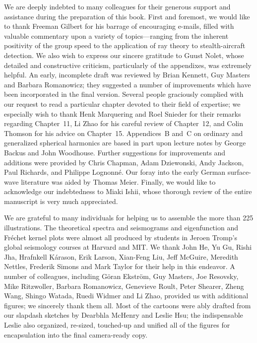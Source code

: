 \thispagestyle{myheadings} 
We are deeply indebted to many colleagues for their generous
support and assistance during the preparation of this book.
First and foremost, we would like to thank Freeman Gilbert
for his barrage of encouraging e-mails, filled with valuable
commentary upon a variety of topics---ranging from the inherent
positivity of the group speed to the application of ray theory
to stealth-aircraft detection.  We also wish to express our
sincere gratitude to Guust Nolet, whose detailed and constructive
criticism, particularly of the appendixes, was extremely helpful.
An early, incomplete draft was reviewed by Brian Kennett,
Guy Masters and Barbara Romanowicz; they suggested
a number of improvements which have been incorporated in the
final version.  Several people graciously complied with our
request to read a particular chapter
devoted to their field of expertise; we especially wish
to thank Henk Marquering and Roel Snieder for their
remarks regarding Chapter~11, Li Zhao for his careful
review of Chapter~12, and Colin Thomson
for his advice on Chapter~15.  Appendices~B and~C on ordinary
and generalized spherical harmonics are based in part upon lecture
notes by George Backus and John Woodhouse.  Further suggestions
for improvements and additions were provided by Chris Chapman, Adam Dziewonski,
Andy Jackson, Paul Richards, and Philippe Lognonn\'{e}.  Our
foray into the early German surface-wave literature was aided
by Thomas Meier.  Finally, we would like to acknowledge our
indebtedness to Miaki Ishii, whose thorough review of the entire
manuscript is very much appreciated.

We are grateful to many individuals for helping us
to assemble the more than 225 illustrations.  The theoretical
spectra and seismograms and eigenfunction and Fr\'{e}chet kernel plots
were almost all produced by students in Jeroen Tromp's global seismology
courses at Harvard and MIT.  We thank John He, Yu Gu, Rishi Jha,
Hrafnkell K\'{a}rason, Erik Larson, Xian-Feng Liu, Jeff McGuire, Meredith Nettles,
Frederik Simons and Mark Taylor for their help in this endeavor.
A number of colleagues, including G\"{o}ran Ekstr\"{o}m, Guy Masters,
Joe Resovsky, Mike Ritzwoller, Barbara Romanowicz, Genevieve Roult,
Peter Shearer, Zheng Wang, Shingo Watada, Ruedi Widmer and Li Zhao,
provided us with additional figures; we sincerely thank them all.
Most of the cartoons were ably drafted from our slapdash sketches
by Dearbhla McHenry and Leslie Hsu; the indispensable Leslie also
organized, re-sized, touched-up and unified all of the figures for
encapsulation into the final camera-ready copy. 

